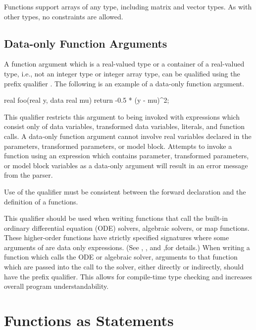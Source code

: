 Functions support arrays of any type, including matrix and vector
types.  As with other types, no constraints are allowed.

\subsection{Data-only Function Arguments}

A function argument which is a real-valued type or
a container of a real-valued type,
i.e., not an integer type or integer array type,
can be qualified using the prefix qualifier .
The following is an example of a data-only function argument.
%
\begin{stancode}
real foo(real y, data real mu) {
  return -0.5 * (y - mu)^2;
}
\end{stancode}
%

This qualifier restricts this argument to being invoked
with expressions which consist only of data variables,
transformed data variables, literals, and function calls.
A data-only function argument cannot involve real variables declared
in the parameters, transformed parameters, or model block.
Attempts to invoke a function using an expression which contains
parameter, transformed parameters, or model block variables
as a data-only argument will result in an error message from the
parser.

Use of the  qualifier must be consistent between the
forward declaration and the definition of a functions.

This qualifier should be used when writing functions that call the
built-in ordinary differential equation (ODE) solvers, algebraic
solvers, or map functions.  These higher-order functions have strictly
specified signatures where some arguments of are data only
expressions. (See ,
, and
,for details.)  When writing a
function which calls the ODE or algebraic solver, arguments to that
function which are passed into the call to the solver, either directly
or indirectly, should have the  prefix qualifier.  This
allows for compile-time type checking and increases overall program
understandability.



\section{Functions as Statements}

